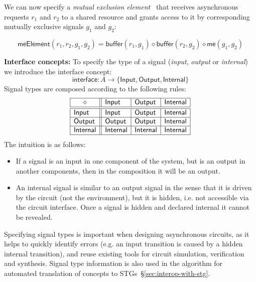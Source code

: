 \documentclass[british,compsoc]{IEEEtran}
\begin{document}
We can now specify a \emph{mutual exclusion element}~\cite{2008_kinniment_synchronisation}
that receives asynchronous requests $r_{1}$ and $r_{2}$ to a shared
resource and grants access to it by corresponding mutually exclusive
signals $g_{1}$ and $g_{2}$:

\vspace{-3mm}
{\small
\[
\mathsf{meElement}(r_{1}, r_{2}, g_{1}, g_{2})\!=\!\mathsf{buffer}(r_{1}, g_{1}) \diamond \mathsf{buffer}(r_{2}, g_{2}) \diamond \mathsf{me}(g_{1}, g_{2})
\]}
\vspace{-3mm}

\textbf{Interface concepts:} To specify the type of a signal (\emph{input},
\emph{output} or \emph{internal}) we introduce the \textsf{interface} concept:
\[
\mathsf{interface} : A \rightarrow \{\mathsf{Input}, \mathsf{Output}, \mathsf{Internal}\}
\]
Signal types are composed according to the following rules:
\[
\begin{array}{|l||l|l|l|}
\hline
\multicolumn{1}{|c||}{\diamond} & \mathsf{Input}    & \mathsf{Output}   & \mathsf{Internal} \\ \hline \hline
\mathsf{Input}   & \mathsf{Input}    & \mathsf{Output}   & \mathsf{Internal} \\ \hline
\mathsf{Output}  & \mathsf{Output}   & \mathsf{Output}   & \mathsf{Internal} \\ \hline
\mathsf{Internal}& \mathsf{Internal} & \mathsf{Internal} & \mathsf{Internal} \\ \hline
\end{array}
\]
The intuition is as follows:
\begin{itemize}
    \item If a signal is an input in one component of the system, but is an
    output in another components, then in the composition it will be an output.
    \item An internal signal is similar to an output signal in the sense
    that it is driven by the circuit (not the environment), but it is hidden, i.e.
    not accessible via the circuit interface. Once a signal is hidden and declared
    internal it cannot be revealed.
\end{itemize}

\noindent Specifying signal types is important when designing asynchronous
circuits, as it helps to quickly identify errors (e.g. an input transition is
caused by a hidden internal transition), and reuse existing tools for circuit
simulation, verification and synthesis. Signal type information is also used
in the algorithm for automated translation of concepts to
STGs~\S\ref{sec:interop-with-stg}.
\end{document}
